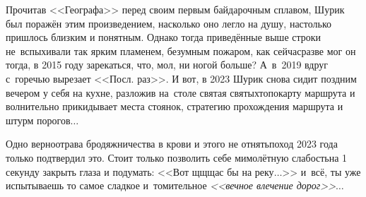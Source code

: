 {{Прочитав <<Географа>> перед своим первым байдарочным сплавом, Шурик был поражён этим произведением, насколько оно легло на душу, настолько пришлось близким и понятным. Однако тогда приведённые выше строки не~вспыхивали так ярким пламенем, безумным пожаром, как сейчас\mdash разве мог он тогда, в 2015 году зарекаться, что, мол, ни ногой больше? А~в~2019 вдруг с~горечью вырезает <<Посл. раз>>. И вот, в 2023 Шурик снова сидит поздним вечером у себя на кухне, разложив на~столе святая святых\mdash топокарту маршрута и волнительно прикидывает места стоянок, стратегию прохождения маршрута и штурм порогов$\ldots$ 

Одно верно\mdash отрава бродяжничества в крови и этого не отнять\mdash поход 2023 года только подтвердил это. Стоит только позволить себе мимолётную слабость\mdash на 1 секунду закрыть глаза и подумать: <<Вот щ\sdash щ\sdash щас бы на реку$\ldots$>> и~всё, ты уже испытываешь то самое сладкое и~томительное \textit{<<вечное влечение дорог>>}$\ldots$

\begin{center}
\end{center}



}

}